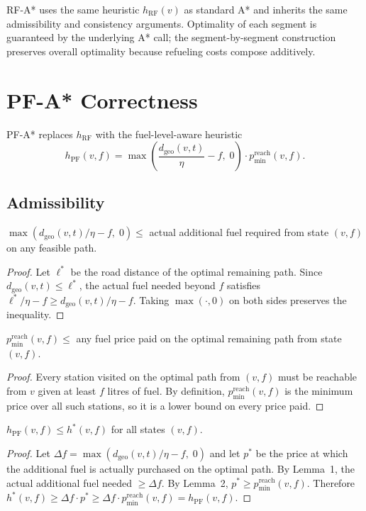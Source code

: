 RF-A* uses the same heuristic $h_{\mathrm{RF}}(v)$ as standard A* and inherits the same
admissibility and consistency arguments.
Optimality of each segment is guaranteed by the underlying A* call; the segment-by-segment
construction preserves overall optimality because refueling costs compose additively.

\section{PF-A* Correctness}
\label{sec:pfa_correctness}

PF-A* replaces $h_{\mathrm{RF}}$ with the fuel-level-aware heuristic
\[
    h_{\mathrm{PF}}(v, f)
    = \max\!\left(\frac{d_{\mathrm{geo}}(v, t)}{\eta} - f,\; 0\right)
      \cdot p_{\min}^{\mathrm{reach}}(v, f).
\]

\subsection{Admissibility}

\begin{lemma}
    $\max(d_{\mathrm{geo}}(v,t)/\eta - f,\; 0) \leq$ actual additional fuel required from
    state $(v,f)$ on any feasible path.
\end{lemma}
\begin{proof}
    Let $\ell^{*}$ be the road distance of the optimal remaining path.
    Since $d_{\mathrm{geo}}(v,t) \leq \ell^{*}$, the actual fuel needed beyond $f$ satisfies
    $\ell^{*}/\eta - f \geq d_{\mathrm{geo}}(v,t)/\eta - f$.
    Taking $\max(\cdot, 0)$ on both sides preserves the inequality.
\end{proof}

\begin{lemma}
    $p_{\min}^{\mathrm{reach}}(v,f) \leq$ any fuel price paid on the optimal remaining path
    from state $(v,f)$.
\end{lemma}
\begin{proof}
    Every station visited on the optimal path from $(v,f)$ must be reachable from $v$
    given at least $f$ litres of fuel.
    By definition, $p_{\min}^{\mathrm{reach}}(v,f)$ is the minimum price over all such
    stations, so it is a lower bound on every price paid.
\end{proof}

\begin{theorem}
    $h_{\mathrm{PF}}(v,f) \leq h^{*}(v,f)$ for all states $(v,f)$.
\end{theorem}
\begin{proof}
    Let $\Delta f = \max(d_{\mathrm{geo}}(v,t)/\eta - f,\; 0)$ and let $p^{*}$ be the price
    at which the additional fuel is actually purchased on the optimal path.
    By Lemma~1, the actual additional fuel needed $\geq \Delta f$.
    By Lemma~2, $p^{*} \geq p_{\min}^{\mathrm{reach}}(v,f)$.
    Therefore $h^{*}(v,f) \geq \Delta f \cdot p^{*} \geq \Delta f \cdot p_{\min}^{\mathrm{reach}}(v,f) = h_{\mathrm{PF}}(v,f)$.
\end{proof}


